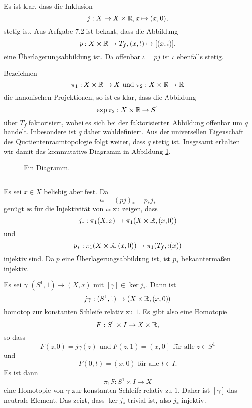 \documentclass[a4paper,10pt]{article}
\begin{document}
\section{}
Es ist klar, dass die Inklusion
\[
 j : X \to X \times \mathbb{R}, x \mapsto (x,0),
\]
stetig ist. Aus Aufgabe 7.2 ist bekant, dass die Abbildung
\[
 p : X \times \mathbb{R} \to T_f, (x,t) \mapsto [(x,t)].
\]
eine Überlagerungsabbildung ist. Da offenbar $\iota = pj$ ist $\iota$ ebenfalls stetig.

Bezeichnen
\[
 \pi_1 : X \times \mathbb{R} \to X \text{ und } \pi_2 : X \times \mathbb{R} \to \mathbb{R}
\]
die kanonischen Projektionen, so ist es klar, dass die Abbildung
\[
 \exp \pi_2 : X \times \mathbb{R} \to S^1
\]
über $T_f$ faktorisiert, wobei es sich bei der faktorisierten Abbildung offenbar um $q$ handelt. Inbesondere ist $q$ daher wohldefiniert. Aus der universellen Eigenschaft des Quotientenraumtopologie folgt weiter, dass $q$ stetig ist. Insgesamt erhalten wir damit das kommutative Diagramm in Abbildung \ref{fig: großes Diagramm}.
\begin{figure}\centering
 \caption{Ein Diagramm.}
 \label{fig: großes Diagramm}
\end{figure}


\subsection{}
Es sei $x \in X$ beliebig aber fest. Da
\[
 \iota_* = (pj)_* = p_* j_*
\]
genügt es für die Injektivität von $\iota_*$ zu zeigen, dass
\[
 j_* : \pi_1(X,x) \to \pi_1(X \times \mathbb{R}, (x,0))
\]
und
\[
 p_* : \pi_1(X \times \mathbb{R}, (x,0)) \to \pi_1(T_f, \iota(x))
\]
injektiv sind. Da $p$ eine Überlagerungsabbildung ist, ist $p_*$ bekanntermaßen injektiv.

Es sei $\gamma : (S^1,1) \to (X,x)$ mit $[\gamma] \in \ker j_*$. Dann ist
\[
 j \gamma : (S^1,1) \to (X \times \mathbb{R}, (x,0))
\]
homotop zur konstanten Schleife relativ zu $1$. Es gibt also eine Homotopie
\[
 F : S^1 \times I \to X \times \mathbb{R},
\]
so dass
\[
 F(z,0) = j\gamma(z) \text{ und } F(z,1) = (x,0) \text{ für alle } z \in S^1
\]
und
\[
 F(0,t) = (x,0) \text{ für alle } t \in I.
\]
Es ist dann
\[
 \pi_1 F : S^1 \times I \to X
\]
eine Homotopie von $\gamma$ zur konstanten Schleife relativ zu $1$. Daher ist $[\gamma]$ das neutrale Element. Das zeigt, dass $\ker j_*$ trivial ist, also $j_*$ injektiv.
\end{document}
